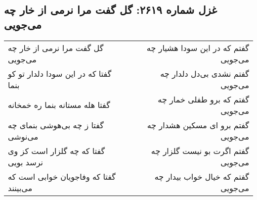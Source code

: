 \begin{center}
\section*{غزل شماره ۲۶۱۹: گل گفت مرا نرمی از خار چه می‌جویی}
\label{sec:2619}
\begin{longtable}{l p{0.5cm} r}
گل گفت مرا نرمی از خار چه می‌جویی
&&
گفتم که در این سودا هشیار چه می‌جویی
\\
گفتا که در این سودا دلدار تو کو بنما
&&
گفتم نشدی بی‌دل دلدار چه می‌جویی
\\
گفتا هله مستانه بنما ره خمخانه
&&
گفتم که برو طفلی خمار چه می‌جویی
\\
گفتا ز چه بی‌هوشی بنمای چه می‌نوشی
&&
گفتم برو ای مسکین هشدار چه می‌جویی
\\
گفتا که چه گلزار است کز وی نرسد بویی
&&
گفتم اگرت بو نیست گلزار چه می‌جویی
\\
گفتا که وفاجویان خوابی است که می‌بینند
&&
گفتم که خیال خواب بیدار چه می‌جویی
\\
\end{longtable}
\end{center}
